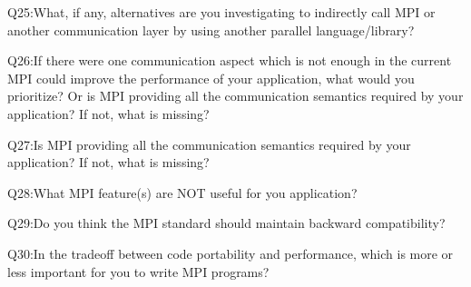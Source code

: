 \begin{description}
\item Q25:What, if any, alternatives are you investigating to indirectly call MPI or another communication layer by using another parallel language/library?
\item Q26:If there were one communication aspect which is not enough in the current MPI could improve the performance of your application, what would you prioritize? Or is MPI providing all the communication semantics required by your application? If not, what is missing?
\item Q27:Is MPI providing all the communication semantics required by your application? If not, what is missing?
\item Q28:What MPI feature(s) are NOT useful for you application?
\item Q29:Do you think the MPI standard should maintain backward compatibility?
\item Q30:In the tradeoff between code portability and performance, which is more or less important for you to write MPI programs?
\end{description}
